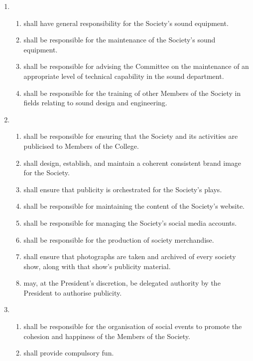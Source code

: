 \documentclass[a4paper]{tufte-handout}
\newcommand{\policyOffset}{12pt}
\newcommand{\policyPub}[2][\policyOffset]{\marginnote[#1]{\textsc{Publicity Policy \S#2}}}
\begin{document}
\begin{enumerate}[resume]
    \item {}
        \begin{enumerate}
            \item shall have general responsibility for the Society's sound equipment.
            \item shall be responsible for the maintenance of the Society's sound equipment.
            \item shall be responsible for advising the Committee on the maintenance of an appropriate level of technical capability in the sound department.
            \item shall be responsible for the training of other Members of the Society in fields relating to sound design and engineering.
        \end{enumerate}
        
    \item {}
        \begin{enumerate}
            \item shall be responsible for ensuring that the Society and its activities are publicised to Members of the College.
            \item shall design, establish, and maintain a coherent consistent brand image for the Society.
            \item shall ensure that publicity is orchestrated for the Society's plays.
            \item shall be responsible for maintaining the content of the Society's website.
            \item shall be responsible for managing the Society's social media accounts.
            \item shall be responsible for the production of society merchandise.
            \item shall ensure that photographs are taken and archived of every society show, along with that show's publicity material.
            \item \policyPub{4} may, at the President's discretion, be delegated authority by the President to authorise publicity.
        \end{enumerate}
        
    \item {}
        \begin{enumerate}
            \item shall be responsible for the organisation of social events to promote the cohesion and happiness of the Members of the Society.
            \item shall provide compulsory fun.
        \end{enumerate}
            

\end{enumerate}
\end{document}
